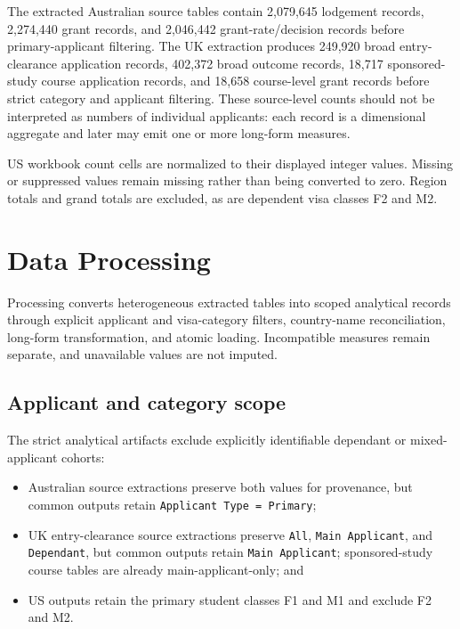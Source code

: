 \documentclass[runningheads]{llncs}
\begin{document}
The extracted Australian source tables contain 2,079,645 lodgement records, 2,274,440 grant records, and 2,046,442 grant-rate/decision records before primary-applicant filtering. The UK extraction produces 249,920 broad entry-clearance application records, 402,372 broad outcome records, 18,717 sponsored-study course application records, and 18,658 course-level grant records before strict category and applicant filtering. These source-level counts should not be interpreted as numbers of individual applicants: each record is a dimensional aggregate and later may emit one or more long-form measures.

US workbook count cells are normalized to their displayed integer values. Missing or suppressed values remain missing rather than being converted to zero. Region totals and grand totals are excluded, as are dependent visa classes F2 and M2.

\section{Data Processing}

Processing converts heterogeneous extracted tables into scoped analytical records through explicit applicant and visa-category filters, country-name reconciliation, long-form transformation, and atomic loading. Incompatible measures remain separate, and unavailable values are not imputed.

\subsection{Applicant and category scope}

The strict analytical artifacts exclude explicitly identifiable dependant or mixed-applicant cohorts:

\begin{itemize}
  \item Australian source extractions preserve both values for provenance, but common outputs retain \texttt{Applicant Type = Primary};
  \item UK entry-clearance source extractions preserve \texttt{All}, \texttt{Main Applicant}, and \texttt{Dependant}, but common outputs retain \texttt{Main Applicant}; sponsored-study course tables are already main-applicant-only; and
  \item US outputs retain the primary student classes F1 and M1 and exclude F2 and M2.
\end{itemize}
\end{document}
